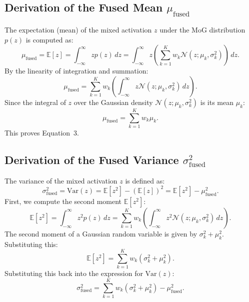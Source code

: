 \documentclass{article}
\theoremstyle{plain}
\theoremstyle{definition}
\theoremstyle{remark}
\begin{document}
\subsection{Derivation of the Fused Mean $\mu_{\text{fused}}$}
The expectation (mean) of the mixed activation $z$ under the MoG distribution $p(z)$ is computed as:
\begin{equation}
\mu_{\text{fused}} = \mathbb{E}[z] = \int_{-\infty}^{\infty} z p(z) \, dz = \int_{-\infty}^{\infty} z \left( \sum_{k=1}^K w_k \mathcal{N}(z; \mu_k, \sigma_k^2) \right) \, dz.
\end{equation}
By the linearity of integration and summation:
\begin{equation}
\mu_{\text{fused}} = \sum_{k=1}^K w_k \left( \int_{-\infty}^{\infty} z \mathcal{N}(z; \mu_k, \sigma_k^2) \, dz \right).
\end{equation}
Since the integral of $z$ over the Gaussian density $\mathcal{N}(z; \mu_k, \sigma_k^2)$ is its mean $\mu_k$:
\begin{equation}
\mu_{\text{fused}} = \sum_{k=1}^K w_k \mu_k.
\end{equation}
This proves Equation~3.

\subsection{Derivation of the Fused Variance $\sigma_{\text{fused}}^2$}
The variance of the mixed activation $z$ is defined as:
\begin{equation}
\sigma_{\text{fused}}^2 = \text{Var}(z) = \mathbb{E}[z^2] - \left( \mathbb{E}[z] \right)^2 = \mathbb{E}[z^2] - \mu_{\text{fused}}^2.
\end{equation}
First, we compute the second moment $\mathbb{E}[z^2]$:
\begin{equation}
\mathbb{E}[z^2] = \int_{-\infty}^{\infty} z^2 p(z) \, dz = \sum_{k=1}^K w_k \left( \int_{-\infty}^{\infty} z^2 \mathcal{N}(z; \mu_k, \sigma_k^2) \, dz \right).
\end{equation}
The second moment of a Gaussian random variable is given by $\sigma_k^2 + \mu_k^2$. Substituting this:
\begin{equation}
\mathbb{E}[z^2] = \sum_{k=1}^K w_k (\sigma_k^2 + \mu_k^2).
\end{equation}
Substituting this back into the expression for $\text{Var}(z)$:
\begin{equation}
\sigma_{\text{fused}}^2 = \sum_{k=1}^K w_k (\sigma_k^2 + \mu_k^2) - \mu_{\text{fused}}^2.
\label{eq:var_intermediate}
\end{equation}
\end{document}
